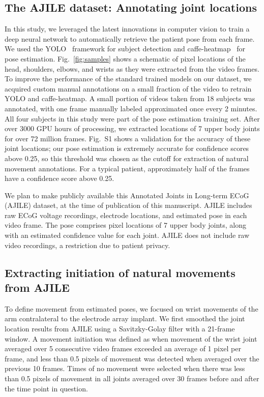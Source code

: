 \documentclass[letterpaper]{article} %
\begin{document}
\subsection{The AJILE dataset: Annotating joint locations}
In this study, we leveraged the latest innovations in computer vision to train a deep neural network to automatically retrieve the patient pose from each frame.
We used the YOLO~\cite{redmon2016you} framework for subject detection and caffe-heatmap~\cite{Pfister15a} for pose estimation. 
Fig.~\ref{fig:samples} shows a schematic of pixel locations of the head, shoulders, elbows, and wrists as they were extracted from the video frames.
To improve the performance of the standard trained models on our dataset, we acquired custom manual annotations on a small fraction of the video to retrain YOLO and caffe-heatmap. 
A small portion of videos taken from 18 subjects was annotated, with one frame manually labeled approximated once every 2 minutes.
All four subjects in this study were part of the pose estimation training set. 
After over 3000 GPU hours of processing, we extracted locations of 7 upper body joints for over 72 million frames. 
Fig.~S1 shows a validation for the accuracy of these joint locations; our pose estimation is extremely accurate for confidence scores above 0.25, so this threshold was chosen as the cutoff for extraction of natural movement annotations. For a typical patient, approximately half of the frames have a confidence score above 0.25.

We plan to make publicly available this Annotated Joints in Long-term ECoG (AJILE) dataset, at the time of publication of this manuscript.
AJILE includes raw ECoG voltage recordings, electrode locations, and estimated pose in each video frame. 
The pose comprises pixel locations of 7 upper body joints, along with an estimated confidence value for each joint.
AJILE does not include raw video recordings, a restriction due to patient privacy.

\subsection{Extracting initiation of natural movements from AJILE}
To define movement from estimated poses, we focused on wrist movements of the arm contralateral to the electrode array implant. 
We first smoothed the joint location results from AJILE using a Savitzky-Golay filter with a 21-frame window. 
A movement initiation was defined as when movement of the wrist joint averaged over 5 consecutive video frames exceeded an average of 1 pixel per frame, and less than 0.5 pixels of movement was detected when averaged over the previous 10 frames.
Times of no movement were selected when there was less than 0.5 pixels of movement in all joints averaged over 30 frames before and after the time point in question. 
\end{document}
